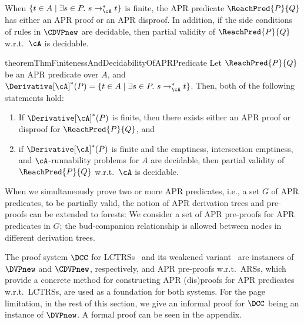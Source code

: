 When $\{ t \in A \mid \exists s \in P.\ s \to_\cA^* t \}$ is finite,
the APR predicate $\ReachPred{P}{Q}$ has either an APR proof or an APR disproof.
In addition, if the side conditions of rules in $\CDVPnew$ are decidable,
then partial validity of $\ReachPred{P}{Q}$ w.r.t.\ $\cA$ is decidable.

\begin{restatable}{theorem}{ThmFinitenessAndDecidabilityOfAPRPredicate}
	\label{thm:finiteness-and-decidability-of-APR-predicates}
	Let $\ReachPred{P}{Q}$ be an APR predicate over $A$,
	and $\Derivative[\cA]^*(P) = \{ t \in A \mid \exists s \in P.\ s \to_\cA^* t \}$.
	Then, both of the following statements hold:
	\begin{enumerate}
		\renewcommand{\labelenumi}{(\arabic{enumi})}
		\leftskip=1ex
		\item
		      If $\Derivative[\cA]^*(P)$ is finite, then there exists either an APR proof or disproof for $\ReachPred{P}{Q}$,
		      and
		\item if $\Derivative[\cA]^*(P)$ is finite and the emptiness, intersection emptiness, and $\cA$-runnability problems for $A$ are decidable, then partial validity of $\ReachPred{P}{Q}$ w.r.t.\ $\cA$
		      is decidable.
	\end{enumerate}
\end{restatable}




When we simultaneously prove two or more APR predicates, i.e., a set $G$ of APR predicates, to be partially valid, the notion of APR derivation trees and pre-proofs can be extended to forests:
We consider a set of APR pre-proofs for APR predicates in $G$;
the bud-companion relationship is allowed between nodes in different derivation trees.

The proof system $\DCC$ for LCTRSs~\cite{CL18} and its weakened variant~\cite{KN23jlamp} are instances of $\DVPnew$ and $\CDVPnew$, respectively,
and APR pre-proofs w.r.t.\ ARSs, which provide a concrete method for constructing APR (dis)proofs for APR predicates w.r.t.\ LCTRSs, are used as a foundation for both systems.
For the page limitation, in the rest of this section, we give an informal proof for $\DCC$ being an instance of $\DVPnew$.
A formal proof can be seen in the appendix.

